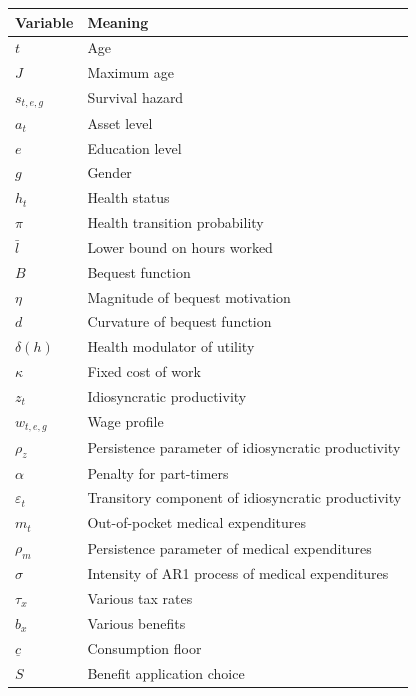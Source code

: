 \documentclass[
10pt, %
a4paper, %
oneside, %
headinclude,footinclude, %
BCOR5mm, %
]{scrartcl}
\begin{document}
\begin{center}
	\begin{tabular}{| l | l |}
	\hline
	Variable & Meaning \\
	\hline
	$t$ & Age \\
	$J$ & Maximum age \\
	$s_{t,e,g}$ & Survival hazard \\
	$a_{t}$ & Asset level \\
	$e$ & Education level \\
	$g$ & Gender \\
	$h_{t}$ & Health status \\
	$\pi$ & Health transition probability \\
	$\bar{l}$ & Lower bound on hours worked \\
	$B$ & Bequest function \\
	$\eta$ & Magnitude of bequest motivation \\
	$d$ & Curvature of bequest function \\
	$\delta(h)$ & Health modulator of utility \\
	$\kappa$ &  Fixed cost of work \\
	$z_{t}$ & Idiosyncratic productivity \\
	$w_{t,e,g}$ & Wage profile \\
	$\rho_z$ & Persistence parameter of idiosyncratic productivity \\
	$\alpha$ & Penalty for part-timers \\
	$\varepsilon_t$ & Transitory component of idiosyncratic productivity \\
	$m_t$ & Out-of-pocket medical expenditures \\
	$\rho_m$ & Persistence parameter of medical expenditures \\
	$\sigma$ & Intensity of AR1 process of medical expenditures \\
	$\tau_x$ & Various tax rates \\
	$b_x$ & Various benefits \\
	$\underline{c}$ & Consumption floor \\
	$S$ &  Benefit application choice \\
	\hline
	\end{tabular}
\end{center}




\renewcommand{\refname}{\spacedlowsmallcaps{References}} %




\end{document}
